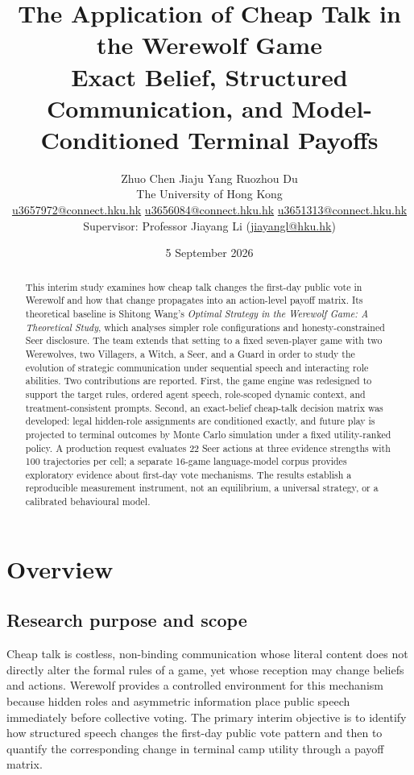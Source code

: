 \documentclass[11pt,a4paper]{article}
\title{\bfseries The Application of Cheap Talk in the Werewolf Game\\[0.4em]
\large Exact Belief, Structured Communication, and Model-Conditioned Terminal Payoffs}
\author{%
Zhuo Chen \quad Jiaju Yang \quad Ruozhou Du\\
\small The University of Hong Kong\\
\footnotesize\href{mailto:u3657972@connect.hku.hk}{u3657972@connect.hku.hk} \quad
\href{mailto:u3656084@connect.hku.hk}{u3656084@connect.hku.hk} \quad
\href{mailto:u3651313@connect.hku.hk}{u3651313@connect.hku.hk}\\[0.35em]
\small Supervisor: Professor Jiayang Li
(\href{mailto:jiayangl@hku.hk}{jiayangl@hku.hk})}
\date{5 September 2026}
\begin{document}
\maketitle

\begin{abstract}
This interim study examines how cheap talk changes the first-day public vote in Werewolf and how that change propagates into an action-level payoff matrix. Its theoretical baseline is Shitong Wang's \emph{Optimal Strategy in the Werewolf Game: A Theoretical Study}, which analyses simpler role configurations and honesty-constrained Seer disclosure. The team extends that setting to a fixed seven-player game with two Werewolves, two Villagers, a Witch, a Seer, and a Guard in order to study the evolution of strategic communication under sequential speech and interacting role abilities. Two contributions are reported. First, the game engine was redesigned to support the target rules, ordered agent speech, role-scoped dynamic context, and treatment-consistent prompts. Second, an exact-belief cheap-talk decision matrix was developed: legal hidden-role assignments are conditioned exactly, and future play is projected to terminal outcomes by Monte Carlo simulation under a fixed utility-ranked policy. A production request evaluates 22 Seer actions at three evidence strengths with 100 trajectories per cell; a separate 16-game language-model corpus provides exploratory evidence about first-day vote mechanisms. The results establish a reproducible measurement instrument, not an equilibrium, a universal strategy, or a calibrated behavioural model.
\end{abstract}

\section{Overview}

\subsection{Research purpose and scope}

Cheap talk is costless, non-binding communication whose literal content does not directly alter the formal rules of a game, yet whose reception may change beliefs and actions. Werewolf provides a controlled environment for this mechanism because hidden roles and asymmetric information place public speech immediately before collective voting. The primary interim objective is to identify how structured speech changes the first-day public vote pattern and then to quantify the corresponding change in terminal camp utility through a payoff matrix.
\end{document}
